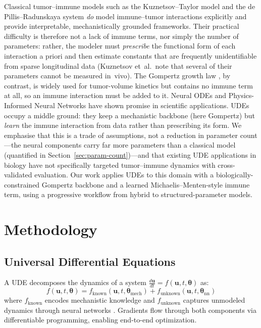 \documentclass{juliacon}
\begin{document}
Classical tumor--immune models such as the Kuznetsov--Taylor model \cite{kuznetsov1994} and the de Pillis--Radunskaya system \cite{depillis2005validated} \emph{do} model immune--tumor interactions explicitly and provide interpretable, mechanistically grounded frameworks. Their practical difficulty is therefore not a lack of immune terms, nor simply the number of parameters: rather, the modeler must \emph{prescribe} the functional form of each interaction a priori and then estimate constants that are frequently unidentifiable from sparse longitudinal data (Kuznetsov et~al.\ note that several of their parameters cannot be measured in~vivo). The Gompertz growth law \cite{vaghi2020gompertz}, by contrast, is widely used for tumor-volume kinetics but contains no immune term at all, so an immune interaction must be added to it. Neural ODEs \cite{chen2018node} and Physics-Informed Neural Networks \cite{raissi2019pinn} have shown promise in scientific applications. UDEs \cite{rackauckas2020ude} occupy a middle ground: they keep a mechanistic backbone (here Gompertz) but \emph{learn} the immune interaction from data rather than prescribing its form. We emphasise that this is a trade of assumptions, not a reduction in parameter count---the neural components carry far more parameters than a classical model (quantified in Section~\ref{sec:param-count})---and that existing UDE applications in biology \cite{shen2023differentiable,aboelyazeed2023differentiable,dandekar2020machine} have not specifically targeted tumor--immune dynamics with cross-validated evaluation. Our work applies UDEs to this domain with a biologically-constrained Gompertz backbone and a learned Michaelis--Menten-style immune term, using a progressive workflow from hybrid to structured-parameter models.

\section{Methodology}

\subsection{Universal Differential Equations}

A UDE decomposes the dynamics of a system $\frac{d\mathbf{u}}{dt} = f(\mathbf{u}, t, \boldsymbol{\theta})$ as:
\begin{equation}
f(\mathbf{u}, t, \boldsymbol{\theta}) = f_{\text{known}}(\mathbf{u}, t, \boldsymbol{\theta}_{\text{mech}}) + f_{\text{unknown}}(\mathbf{u}, t, \boldsymbol{\theta}_{\text{nn}})
\label{eq:ude_decomposition}
\end{equation}
where $f_{\text{known}}$ encodes mechanistic knowledge and $f_{\text{unknown}}$ captures unmodeled dynamics through neural networks \cite{lu2021deeponet,massaroli2020dissecting,finlay2020train}. Gradients flow through both components via differentiable programming, enabling end-to-end optimization.
\end{document}
